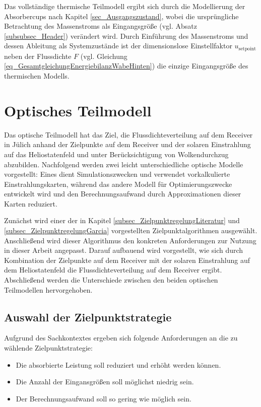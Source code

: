 \vspace*{-\baselineskip}Das vollständige thermische Teilmodell ergibt sich durch die Modellierung der Absorbercups nach Kapitel \ref{sec_Ausgangszustand}, wobei die ursprüngliche Betrachtung des Massenstroms als Eingangsgröße (vgl. Absatz \ref{subsubsec_Header}) verändert wird.
Durch Einführung des Massenstroms und dessen Ableitung als Systemzustände ist der dimensionslose Einstellfaktor $u_{\mathrm{setpoint}}$ neben der Flussdichte $F$ (vgl. Gleichung \ref{eq_GesamtgleichungEnergiebilanzWabeHinten}) die einzige Eingangsgröße des thermischen Modells.


\section{Optisches Teilmodell} \label{sec_optischesModell}
Das optische Teilmodell hat das Ziel, die Flussdichteverteilung auf dem Receiver in Jülich anhand der Zielpunkte auf dem Receiver und der solaren Einstrahlung auf das Heliostatenfeld und unter Berücksichtigung von Wolkendurchzug abzubilden.
Nachfolgend werden zwei leicht unterschiedliche optische Modelle vorgestellt:
Eines dient Simulationszwecken und verwendet vorkalkulierte Einstrahlungskarten, während das andere Modell für Optimierungszwecke entwickelt wird und den Berechnungsaufwand durch Approximationen dieser Karten reduziert.

Zunächst wird einer der in Kapitel \ref{subsec_ZielpunktregelungLiteratur} und \ref{subsec_ZielpunktregelungGarcia} vorgestellten Zielpunktalgorithmen ausgewählt.
Anschließend wird dieser Algorithmus den konkreten Anforderungen zur Nutzung in dieser Arbeit angepasst.
Darauf aufbauend wird vorgestellt, wie sich durch Kombination der Zielpunkte auf dem Receiver mit der solaren Einstrahlung auf dem Heliostatenfeld die Flussdichteverteilung auf dem Receiver ergibt.
Abschließend werden die Unterschiede zwischen den beiden optischen Teilmodellen hervorgehoben.


\subsection{Auswahl der Zielpunktstrategie} \label{subsec_AuswahlAlgorithmus}
Aufgrund des Sachkontextes ergeben sich folgende Anforderungen an die zu wählende Zielpunktstrategie:
\begin{itemize}
\item Die absorbierte Leistung soll reduziert und erhöht werden können.
\item Die Anzahl der Eingansgrößen soll möglichst niedrig sein.
\item Der Berechnungsaufwand soll so gering wie möglich sein.
\end{itemize}

